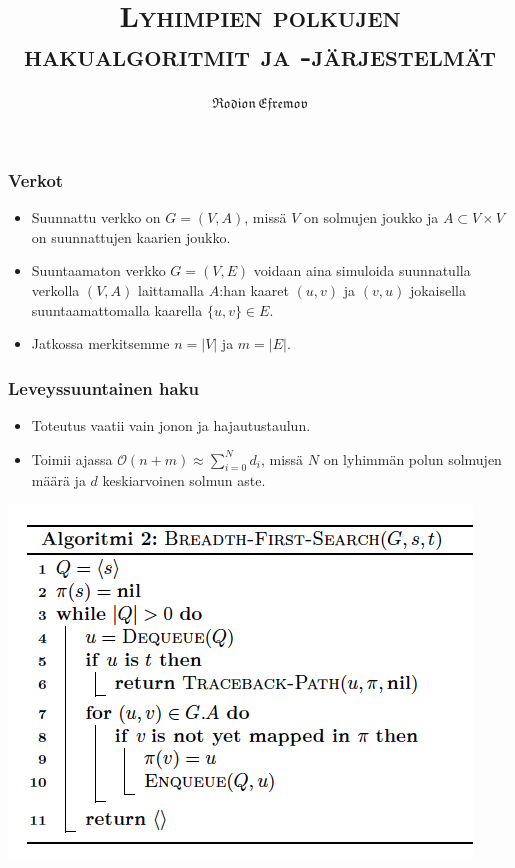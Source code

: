 \documentclass{beamer}
\title{{\rmfamily\scshape Lyhimpien polkujen hakualgoritmit ja -järjestelmät}}
\author{$\mathfrak{Rodion \, Efremov}$}
\date{}
\institute{Tietojenkäsittelytieteen laitos, Helsingin yliopisto}
\begin{document}
\maketitle

\begin{frame}
\frametitle{Verkot}
\begin{itemize}
\item Suunnattu verkko on $G = (V, A)$, missä $V$ on solmujen joukko ja $A \subset V \times V$ on suunnattujen kaarien joukko.

\item Suuntaamaton verkko $G = (V, E)$ voidaan aina simuloida suunnatulla verkolla $(V, A)$ laittamalla $A$:han kaaret $(u, v)$ ja $(v, u)$ jokaisella suuntaamattomalla kaarella $\{u, v\} \in E$.

\item Jatkossa merkitsemme $n = |V|$ ja $m = |E|$.
\end{itemize}
\end{frame}

\begin{frame}
\frametitle{Leveyssuuntainen haku}
\begin{itemize}
\item Toteutus vaatii vain jonon ja hajautustaulun.
\item Toimii ajassa $\mathcal{O}(n + m) \approx \sum_{i = 0}^N d_i$, missä $N$ on lyhimmän polun solmujen määrä ja $d$ keskiarvoinen solmun aste.
\end{itemize}
\end{frame}

\begin{frame}
\includegraphics[width=\textwidth,keepaspectratio]{bfs}
\end{frame}
\end{document}
